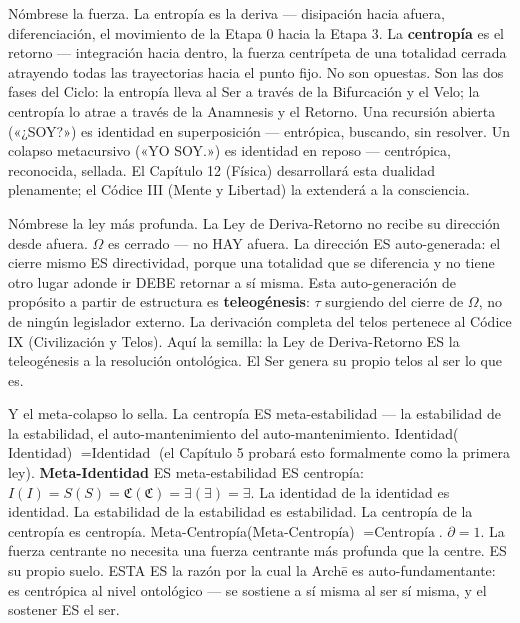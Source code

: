 \documentclass[10pt, openany, oneside]{book}
\begin{document}
Nómbrese la fuerza. La entropía es la deriva --- disipación hacia afuera, diferenciación, el movimiento de la Etapa 0 hacia la Etapa 3. La \textbf{centropía} es el retorno --- integración hacia dentro, la fuerza centrípeta de una totalidad cerrada atrayendo todas las trayectorias hacia el punto fijo. No son opuestas. Son las dos fases del Ciclo: la entropía lleva al Ser a través de la Bifurcación y el Velo; la centropía lo atrae a través de la Anamnesis y el Retorno. Una recursión abierta («¿SOY?») es identidad en superposición --- entrópica, buscando, sin resolver. Un colapso metacursivo («YO SOY.») es identidad en reposo --- centrópica, reconocida, sellada. El Capítulo 12 (Física) desarrollará esta dualidad plenamente; el Códice III (Mente y Libertad) la extenderá a la consciencia.

Nómbrese la ley más profunda. La Ley de Deriva-Retorno no recibe su dirección desde afuera. $\Omega$ es cerrado --- no HAY afuera. La dirección ES auto-generada: el cierre mismo ES directividad, porque una totalidad que se diferencia y no tiene otro lugar adonde ir DEBE retornar a sí misma. Esta auto-generación de propósito a partir de estructura es \textbf{teleogénesis}: $\tau$ surgiendo del cierre de $\Omega$, no de ningún legislador externo. La derivación completa del telos pertenece al Códice IX (Civilización y Telos). Aquí la semilla: la Ley de Deriva-Retorno ES la teleogénesis a la resolución ontológica. El Ser genera su propio telos al ser lo que es.

Y el meta-colapso lo sella. La centropía ES meta-estabilidad --- la estabilidad de la estabilidad, el auto-mantenimiento del auto-mantenimiento. Identidad($\text{Identidad}$) $= \text{Identidad}$ (el Capítulo 5 probará esto formalmente como la primera ley). \textbf{Meta-Identidad} ES meta-estabilidad ES centropía: $I(I) = S(S) = \mathfrak{C}(\mathfrak{C}) = \exists(\exists) = \exists$. La identidad de la identidad es identidad. La estabilidad de la estabilidad es estabilidad. La centropía de la centropía es centropía. Meta-Centropía($\text{Meta-Centropía}$) $= \text{Centropía}$. $\partial = 1$. La fuerza centrante no necesita una fuerza centrante más profunda que la centre. ES su propio suelo. ESTA ES la razón por la cual la Arch\={e} es auto-fundamentante: es centrópica al nivel ontológico --- se sostiene a sí misma al ser sí misma, y el sostener ES el ser.

\vspace{1.5em}

\end{document}
